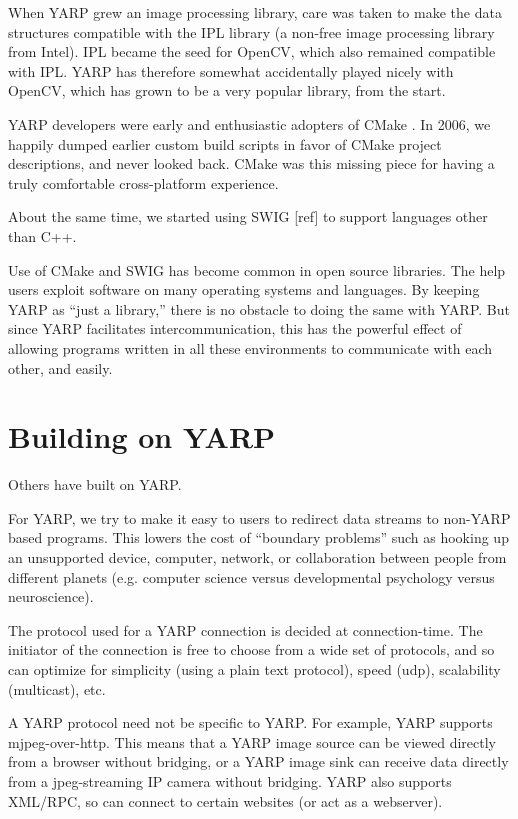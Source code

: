 When YARP grew an image processing library, care was taken to make the
data structures compatible with the IPL library (a non-free image
processing library from Intel).  IPL became the seed for OpenCV, which
also remained compatible with IPL. YARP has therefore somewhat
accidentally played nicely with OpenCV, which has grown to be a very
popular library, from the start.

YARP developers were early and enthusiastic adopters of CMake
\cite{fitzpatrick10cmaking}.  In 2006, we happily dumped
earlier custom build scripts in favor of CMake project descriptions,
and never looked back.  CMake was this missing piece for having a
truly comfortable cross-platform experience.

About the same time, we started using SWIG [ref] to support languages
other than C++.

Use of CMake and SWIG has become common in open source libraries.
The help users exploit software on many operating systems and 
languages.  By keeping YARP as ``just a library,'' there is no
obstacle to doing the same with YARP.  But since YARP facilitates
intercommunication, this has the powerful effect of allowing 
programs written in all these environments to communicate with
each other, and easily.



\section{Building on YARP}

Others have built on YARP.


For YARP, we try to make it easy to users to redirect data streams to
non-YARP based programs.  This lowers the cost of ``boundary
problems'' such as hooking up an unsupported device, computer,
network, or collaboration between people from different planets
(e.g. computer science versus developmental psychology versus
neuroscience).

The protocol used for a YARP connection is decided at connection-time.
The initiator of the connection is free to choose from a wide set of
protocols, and so can optimize for simplicity (using a plain text
protocol), speed (udp), scalability (multicast), etc.

A YARP protocol need not be specific to YARP.  For example, YARP
supports mjpeg-over-http.  This means that a YARP image source can be
viewed directly from a browser without bridging, or a YARP image sink
can receive data directly from a jpeg-streaming IP camera without
bridging.  YARP also supports XML/RPC, so can connect to certain
websites (or act as a webserver).

